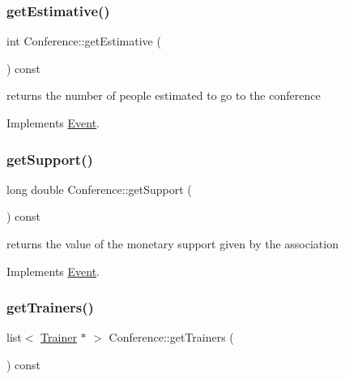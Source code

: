 \subsubsection{\texorpdfstring{get\+Estimative()}{getEstimative()}}
{\footnotesize\ttfamily int Conference\+::get\+Estimative (\begin{DoxyParamCaption}{ }\end{DoxyParamCaption}) const\hspace{0.3cm}{\ttfamily [virtual]}}



returns the number of people estimated to go to the conference 



Implements \hyperlink{classEvent_a18ac55c239f648fc0ad5687c426f2a8f}{Event}.

\mbox{\label{classConference_a6ca3f0f7b2714881dbc108ea7f08646f}} 
\subsubsection{\texorpdfstring{get\+Support()}{getSupport()}}
{\footnotesize\ttfamily long double Conference\+::get\+Support (\begin{DoxyParamCaption}{ }\end{DoxyParamCaption}) const\hspace{0.3cm}{\ttfamily [virtual]}}



returns the value of the monetary support given by the association 



Implements \hyperlink{classEvent_a9170bfcbd9b00015dafc5d5cc69a2cfe}{Event}.

\mbox{\label{classConference_aae9e92d48205a80fa42e94564e3568c5}} 
\subsubsection{\texorpdfstring{get\+Trainers()}{getTrainers()}}
{\footnotesize\ttfamily list$<$ \hyperlink{classTrainer}{Trainer} $\ast$ $>$ Conference\+::get\+Trainers (\begin{DoxyParamCaption}{ }\end{DoxyParamCaption}) const\hspace{0.3cm}{\ttfamily [virtual]}}



